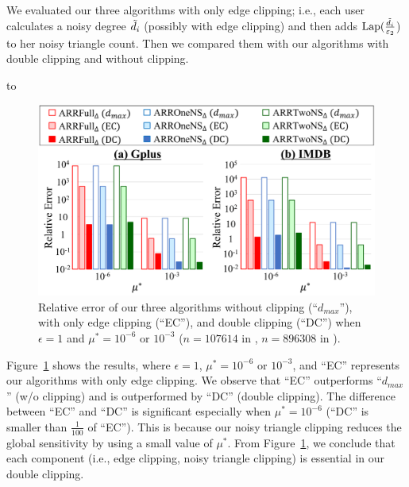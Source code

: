 {We evaluated our three algorithms with only
edge clipping; i.e., each user calculates a noisy degree $\tilde{d}_i$ (possibly with edge clipping) and then adds $\textrm{Lap}(\frac{\tilde{d}_i}{\varepsilon_2}$) to her noisy triangle count.
Then we compared them with our algorithms with double clipping and without clipping.

\begin{table}[t]
\caption{\#$4$-cycles $C_4$ in each graph dataset.}
\centering
\hbox to
\label{tab:resA_4cycles}
\end{table}

\begin{figure}[t]
  \centering
  \includegraphics[width=0.99\linewidth]{fig/res2_w_Lap_EC.pdf}
  \vspace{-4mm}
  \caption{Relative error of our three algorithms without clipping (``$d_{max}$''), with only edge clipping (``EC''), and double clipping (``DC'') when $\epsilon=1$ and $\mu^* = 10^{-6}$ or $10^{-3}$ ($n=107614$ in \GPlus{}, $n=896308$ in \IMDB{}).}
  \label{fig:res2_w_Lap_EC}
\end{figure}

Figure~\ref{fig:res2_w_Lap_EC} shows the results, where $\epsilon=1$, $\mu^* = 10^{-6}$ or $10^{-3}$, and ``EC'' represents our algorithms with only
edge clipping.
We observe that ``EC''
outperforms ``$d_{max}$'' (w/o clipping) and is outperformed by ``DC'' (double clipping).
The difference between ``EC'' and ``DC'' is significant especially when $\mu^* = 10^{-6}$ (``DC'' is smaller than $\frac{1}{100}$ of ``EC'').
This is because our noisy triangle clipping reduces the global sensitivity by using a small value of
$\mu^*$. 
From Figure~\ref{fig:res2_w_Lap_EC}, we conclude that each component (i.e.,
edge clipping, noisy triangle clipping) is essential in our double clipping.

}
